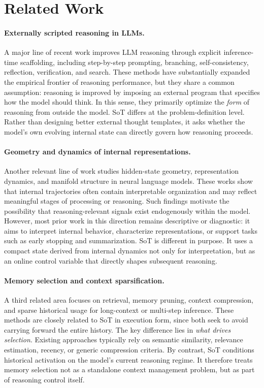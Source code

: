 
\section{Related Work}
\label{sec:related}

\paragraph{Externally scripted reasoning in LLMs.}
A major line of recent work improves LLM reasoning through explicit inference-time scaffolding, including step-by-step prompting, branching, self-consistency, reflection, verification, and search. These methods have substantially expanded the empirical frontier of reasoning performance, but they share a common assumption: reasoning is improved by imposing an external program that specifies how the model should think. In this sense, they primarily optimize the \emph{form} of reasoning from outside the model. SoT differs at the problem-definition level. Rather than designing better external thought templates, it asks whether the model's own evolving internal state can directly govern how reasoning proceeds.

\paragraph{Geometry and dynamics of internal representations.}
Another relevant line of work studies hidden-state geometry, representation dynamics, and manifold structure in neural language models. These works show that internal trajectories often contain interpretable organization and may reflect meaningful stages of processing or reasoning. Such findings motivate the possibility that reasoning-relevant signals exist endogenously within the model. However, most prior work in this direction remains descriptive or diagnostic: it aims to interpret internal behavior, characterize representations, or support tasks such as early stopping and summarization. SoT is different in purpose. It uses a compact state derived from internal dynamics not only for interpretation, but as an online control variable that directly shapes subsequent reasoning.

\paragraph{Memory selection and context sparsification.}
A third related area focuses on retrieval, memory pruning, context compression, and sparse historical usage for long-context or multi-step inference. These methods are closely related to SoT in execution form, since both seek to avoid carrying forward the entire history. The key difference lies in \emph{what drives selection}. Existing approaches typically rely on semantic similarity, relevance estimation, recency, or generic compression criteria. By contrast, SoT conditions historical activation on the model's current reasoning regime. It therefore treats memory selection not as a standalone context management problem, but as part of reasoning control itself.

